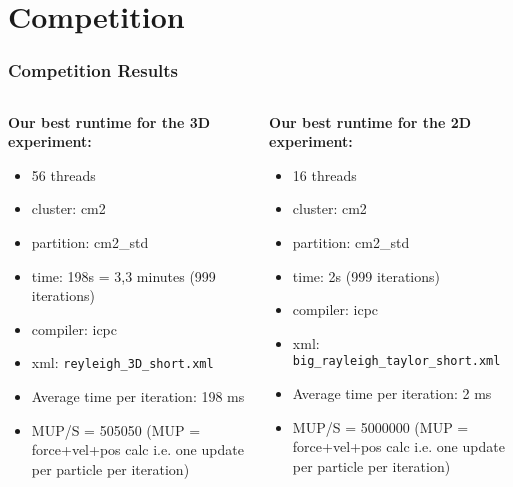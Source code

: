 
\section{Competition}
\label{sec:competition}

\begin{frame}
    \frametitle{Competition Results}

    \begin{columns}
        \begin{column}{0.5\textwidth}
            \textbf{Our best runtime for the 3D experiment:}

            \begin{itemize}
                \item 56 threads 
                \item cluster: cm2
                \item partition: cm2\_std
                \item time: 198s = 3,3 minutes (999 iterations)
                \item compiler: icpc
                \item xml: \texttt{reyleigh\_3D\_short.xml} 
                \item Average time per iteration: 198 ms
                \item MUP/S = 505050 (MUP = force+vel+pos calc i.e. one update per particle per iteration)
            \end{itemize}
        \end{column}
        \vrule
        \hspace{10pt}
        \begin{column}{0.5\textwidth}
            \textbf{Our best runtime for the 2D experiment:}

            \begin{itemize}
                \item 16 threads 
                \item cluster: cm2
                \item partition: cm2\_std
                \item time: 2s (999 iterations)
                \item compiler: icpc
                \item xml: \texttt{big\_rayleigh\_taylor\_short.xml}
                \item Average time per iteration: 2 ms
                \item MUP/S = 5000000 (MUP = force+vel+pos calc i.e. one update per particle per iteration)
            \end{itemize}
        \end{column}
    \end{columns}
\end{frame}